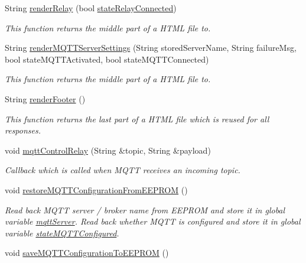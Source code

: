 \begin{DoxyCompactItemize}
String \hyperlink{WIFIOnOff_8ino_a1c9dd84a6d6ca1ea206f310605cc049d}{render\-Relay} (bool \hyperlink{WIFIOnOff_8ino_a48a5ee80a30c37768bf1e198f1ee5692}{state\-Relay\-Connected})
\begin{DoxyCompactList}\small\item\em This function returns the middle part of a H\-T\-M\-L file to. \end{DoxyCompactList}\item 
String \hyperlink{WIFIOnOff_8ino_a4dfcb1cefe2bee38d172e3f327c1a72d}{render\-M\-Q\-T\-T\-Server\-Settings} (String stored\-Server\-Name, String failure\-Msg, bool state\-M\-Q\-T\-T\-Activated, bool state\-M\-Q\-T\-T\-Connected)
\begin{DoxyCompactList}\small\item\em This function returns the middle part of a H\-T\-M\-L file to. \end{DoxyCompactList}\item 
String \hyperlink{WIFIOnOff_8ino_a12a8bd3c3a1288633c3eade6ee8e77cf}{render\-Footer} ()
\begin{DoxyCompactList}\small\item\em This function returns the last part of a H\-T\-M\-L file which is reused for all responses. \end{DoxyCompactList}\item 
void \hyperlink{WIFIOnOff_8ino_ab913592c54bd79feda56cbdc86f44641}{mqtt\-Control\-Relay} (String \&topic, String \&payload)
\begin{DoxyCompactList}\small\item\em Callback which is called when M\-Q\-T\-T receives an incoming topic. \end{DoxyCompactList}\item 
void \hyperlink{WIFIOnOff_8ino_a42318ba7ac1f636b3bd64bf83a99dee2}{restore\-M\-Q\-T\-T\-Configuration\-From\-E\-E\-P\-R\-O\-M} ()
\begin{DoxyCompactList}\small\item\em Read back M\-Q\-T\-T server / broker name from E\-E\-P\-R\-O\-M and store it in global variable \hyperlink{WIFIOnOff_8ino_a020889fcca6224d14f4d3f4241ca4467}{mqtt\-Server}. Read back whether M\-Q\-T\-T is configured and store it in global variable \hyperlink{WIFIOnOff_8ino_a3f27c574110acbefe064ca29a7ce289d}{state\-M\-Q\-T\-T\-Configured}. \end{DoxyCompactList}\item 
void \hyperlink{WIFIOnOff_8ino_a006d783b06cfbafe0c614692c894e2ec}{save\-M\-Q\-T\-T\-Configuration\-To\-E\-E\-P\-R\-O\-M} ()

\end{DoxyCompactItemize}
